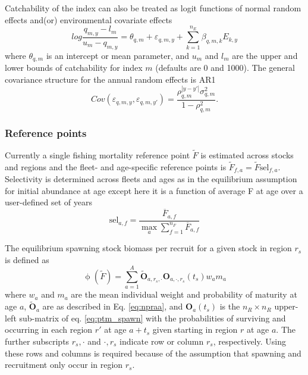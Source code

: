 \documentclass[
]{article}
\begin{document}
Catchability of the index can also be treated as logit functions of
normal random effects and(or) environmental covariate effects
\[log \frac{q_{m,y}-l_m}{u_m-q_{m,y}} = \theta_{q,m} + \varepsilon_{q,m,y}  + \sum^{n_E}_{k=1} \beta_{q,m,k} E_{k,y}\]
where \(\theta_{q,m}\) is an intercept or mean parameter, and \(u_{m}\)
and \(l_{m}\) are the upper and lower bounds of catchability for index
\(m\) (defaults are 0 and 1000). The general covariance structure for
the annual random effects is AR1
\[Cov\left(\varepsilon_{q,m,y},\varepsilon_{q,m,y'}\right) =   \frac{\rho_{q,m}^{|y-y'|}\sigma^2_{q,m}}{1 - \rho_{q,m}^2}.\]

\hypertarget{reference-points}{%
\subsubsection*{Reference points}\label{reference-points}}

Currently a single fishing mortality reference point \(\widetilde F\) is
estimated across stocks and regions and the fleet- and age-specific
reference points is
\(\widetilde F_{f,a} = \widetilde F \text{sel}_{f,a}\). Selectivity is
determined across fleets and ages as in the equilibrium assumption for
initial abundance at age except here it is a function of average F at
age over a user-defined set of years \begin{equation}\label{eq:spr_sel}
  \text{sel}_{a,f} = \frac{\overline F_{a,f}}{\max_a \sum^{n_F}_{f=1}{\overline F}_{a,f}}
\end{equation}

The equilibrium spawning stock biomass per recruit for a given stock in
region \(r_s\) is defined as \begin{equation}\label{eq:ssbpr}
 \upphi(\widetilde{F}) = \sum^{A}_{a=1} \widetilde{\mathbf{O}}_{a,r_s,\cdot} \mathbf{O}_{a,\cdot,r_s}(t_s) w_{a} m_{a}
\end{equation} where \(w_{a}\) and \(m_{a}\) are the mean individual
weight and probability of maturity at age \(a\),
\(\widetilde{\mathbf{O}}_{a}\) are as described in Eq. \ref{eq:npraa},
and \(\mathbf{O}_{a}(t_s)\) is the \(n_R \times n_R\) upper-left
sub-matrix of eq. \ref{eq:ptm_spawn} with the probabilities of surviving
and occurring in each region \(r'\) at age \(a+t_s\) given starting in
region \(r\) at age \(a\). The further subscripts \(r_s,\cdot\) and
\(\cdot,r_s\) indicate row or column \(r_s\), respectively. Using these
rows and columns is required because of the assumption that spawning and
recruitment only occur in region \(r_s\).
\end{document}

